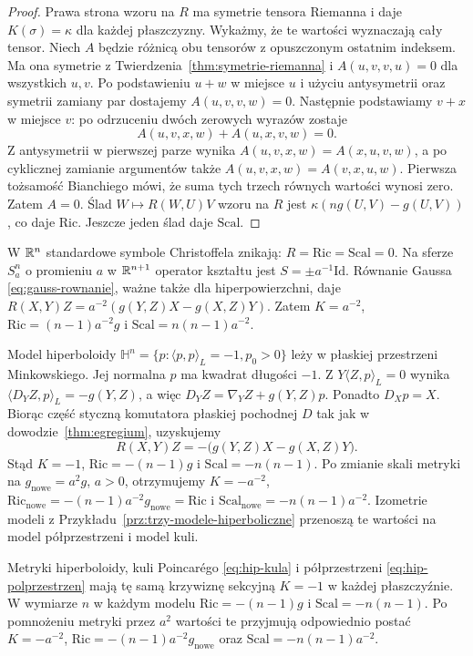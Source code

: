 \begin{proof}
Prawa strona wzoru na $R$ ma symetrie tensora
Riemanna i daje $K(\sigma)=\kappa$ dla każdej
płaszczyzny. Wykażmy, że te wartości wyznaczają
cały tensor. Niech $A$ będzie różnicą obu tensorów
z opuszczonym ostatnim indeksem. Ma ona symetrie
z Twierdzenia~\ref{thm:symetrie-riemanna} i
$A(u,v,v,u)=0$ dla wszystkich $u,v$.
Po podstawieniu $u+w$ w miejsce $u$ i użyciu
antysymetrii oraz symetrii zamiany par dostajemy
$A(u,v,v,w)=0$. Następnie podstawiamy $v+x$
w miejsce $v$: po odrzuceniu dwóch zerowych
wyrazów zostaje
\[
 A(u,v,x,w)+A(u,x,v,w)=0.
\]
Z antysymetrii w pierwszej parze wynika
$A(u,v,x,w)=A(x,u,v,w)$, a po cyklicznej
zamianie argumentów także
$A(u,v,x,w)=A(v,x,u,w)$. Pierwsza tożsamość
Bianchiego mówi, że suma tych trzech równych
wartości wynosi zero. Zatem $A=0$.
Ślad $W\mapsto R(W,U)V$ wzoru na $R$ jest
$\kappa(ng(U,V)-g(U,V))$, co daje $\mathrm{Ric}$.
Jeszcze jeden ślad daje $\mathrm{Scal}$.
\end{proof}

\begin{przyklad}\label{prz:krzywizna-modele}
W $\mathbb{R}^n$ standardowe symbole Christoffela znikają:
$R=\mathrm{Ric}=\mathrm{Scal}=0$. Na sferze $S_a^n$
o promieniu $a$ w $\mathbb{R}^{n+1}$ operator kształtu
jest $S=\pm a^{-1}\mathrm{Id}$. Równanie Gaussa
\eqref{eq:gauss-rownanie}, ważne także dla
hiperpowierzchni, daje
$R(X,Y)Z=a^{-2}(g(Y,Z)X-g(X,Z)Y)$.
Zatem $K=a^{-2}$, $\mathrm{Ric}=(n-1)a^{-2}g$
i $\mathrm{Scal}=n(n-1)a^{-2}$.

Model hiperboloidy $\mathbb H^n=\{p:\langle p,p\rangle_L=-1,
p_0>0\}$ leży w płaskiej przestrzeni Minkowskiego.
Jej normalna $p$ ma kwadrat długości $-1$.
Z $Y\langle Z,p\rangle_L=0$ wynika
$\langle D_YZ,p\rangle_L=-g(Y,Z)$, a więc
$D_YZ=\nabla_YZ+g(Y,Z)p$. Ponadto $D_Xp=X$.
Biorąc część styczną komutatora płaskiej pochodnej
$D$ tak jak w dowodzie~\ref{thm:egregium}, uzyskujemy
\[
 R(X,Y)Z=-\bigl(g(Y,Z)X-g(X,Z)Y\bigr).
\]
Stąd $K=-1$, $\mathrm{Ric}=-(n-1)g$ i
$\mathrm{Scal}=-n(n-1)$. Po zmianie skali metryki
na $g_{\mathrm{nowe}}=a^2g$, $a>0$, otrzymujemy
$K=-a^{-2}$, $\mathrm{Ric}_{\mathrm{nowe}}
=-(n-1)a^{-2}g_{\mathrm{nowe}}=\mathrm{Ric}$ i
$\mathrm{Scal}_{\mathrm{nowe}}=-n(n-1)a^{-2}$.
Izometrie modeli z Przykładu~\ref{prz:trzy-modele-hiperboliczne}
przenoszą te wartości na model półprzestrzeni
i model kuli.
\end{przyklad}

\begin{stwierdzenie}
\label{prop:krzywizna-trzy-modele-hiperboliczne}
Metryki hiperboloidy, kuli Poincarégo
\eqref{eq:hip-kula} i półprzestrzeni
\eqref{eq:hip-polprzestrzen} mają tę samą
krzywiznę sekcyjną $K=-1$ w każdej płaszczyźnie.
W wymiarze $n$ w każdym modelu
$\mathrm{Ric}=-(n-1)g$ i
$\mathrm{Scal}=-n(n-1)$. Po pomnożeniu metryki
przez $a^2$ wartości te przyjmują odpowiednio
postać $K=-a^{-2}$,
$\mathrm{Ric}=-(n-1)a^{-2}g_{\mathrm{nowe}}$
oraz $\mathrm{Scal}=-n(n-1)a^{-2}$.
\end{stwierdzenie}

